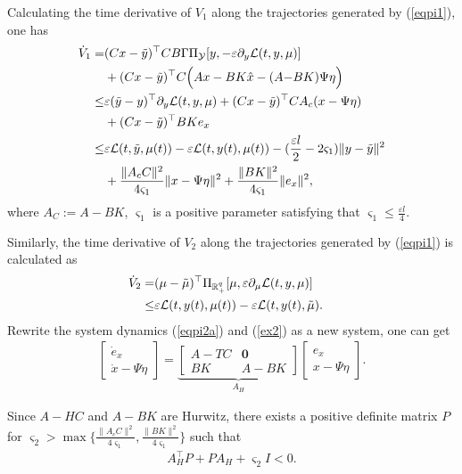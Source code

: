 \documentclass[final,5p,times,twocolumn,authoryear]{elsarticle}
\begin{document}
	Calculating the time derivative of $V_1$ along the trajectories generated by (\ref{eqpi1}), one has
	\begin{align}
		\dot{V}_1
		=
		&(Cx-\tilde{y})^\top CB\Gamma \Pi_{\mathcal{Y}}[y, -\varepsilon \partial_{y}\mathcal{L}(t,y,\mu)]\notag\\
		&+ (Cx-\tilde{y})^\top C\Big(Ax-BK\hat x-(A{-}B K)\Psi\eta\Big)\notag\\
		\le 
		&\varepsilon (\tilde{y}-y)^\top \partial_{y}\mathcal{L}(t,y,\mu) + (Cx-\tilde{y})^\top CA_c(x - \Psi\eta)\notag\\
		&+ (Cx-\tilde{y})^\top BKe_x\notag\\
		\le 
		&\varepsilon\mathcal{{L}}(t,\tilde y,\mu(t))-\varepsilon\mathcal{{L}}(t,y(t),\mu(t)) -(\frac{\varepsilon l}{2}-2\varsigma_1)\|y - \tilde{y}\|^2\notag\\
		&+\frac{\|A_cC\|^2}{4\varsigma_1} \| x - \Psi\eta\|^2+ \frac{\|BK\|^2}{4\varsigma_1}\|e_x\|^2,\label{v111}
	\end{align}
	where $A_C:=A-BK$, $\varsigma_1$ is a positive parameter satisfying that $\varsigma_1\le\frac{\varepsilon l}{4}$.
	
	Similarly, the time derivative of $V_2$ along the trajectories generated by (\ref{eqpi1}) is calculated as
	\begin{align}
		\dot{V}_2
		=
		&(\mu-\tilde{\mu})^\top \Pi_{\mathbb{R}_+^q}[\mu,\varepsilon  \partial_{\mu}\mathcal{L}(t,y,\mu)]\notag\\
		\le 
		&\varepsilon\mathcal{{L}}(t,y(t),\mu(t)) -\varepsilon\mathcal{{L}}(t,y(t),\tilde{\mu}).&\label{v112}
	\end{align}
	Rewrite the system dynamics (\ref{eqpi2a}) and (\ref{ex2}) as a new system, one can get
	\begin{align}
		\begin{bmatrix} \dot{e}_x \\\dot x - \Psi\dot\eta  \end{bmatrix}
		=\underbrace{\begin{bmatrix} A-TC &\boldsymbol{0}\\BK  &A-BK \end{bmatrix}}_{A_H}
		\begin{bmatrix} e_x \\x - \Psi\eta  \end{bmatrix}.
	\end{align}
	
	Since $A-HC$ and $A-BK$ are Hurwitz, there exists a positive definite matrix $P$ for $\varsigma_2>\max\{\frac{\|A_cC\|^2}{4\varsigma_1}, \frac{\|BK\|^2}{4\varsigma_1}\}$ such that
	\begin{align}
		A_H^\top P + PA_H + \varsigma_2I < 0.\label{v113}
	\end{align}
	
\end{document}
